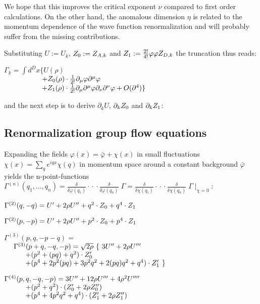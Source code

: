 \documentclass[a4paper,aps,prl,twocolumn,groupedaddress]{revtex4}
\begin{document}
\bigskip
\noindent
We hope that this improves the critical exponent $\nu$ compared to first order calculations.
On the other hand, the anomalous dimension $\eta$ is related to the momentum dependence of the
wave function renormalization and will probably suffer from the missing contributions.

\bigskip
\noindent
Substituting $U:=U_k$, $Z_0:=Z_{A,k}$ and $Z_1:=\frac{2!}{4!}\varphi \varphi Z_{D,k}$ the 
truncation thus reads:

\bigskip $ \Gamma_k = \int \limits d^Dx \{ U(\rho) $\\
$ ~~~~~~~~~~~~~~~~ + Z_0(\rho) \cdot \frac{1}{2!} \partial_\mu \varphi \partial^\mu \varphi $\\
$ ~~~~~~~~~~~~~~~~ + Z_1(\rho) \cdot \frac{1}{2!} \partial_\mu \partial^\mu \varphi \partial_\nu \partial^\nu \varphi + O(\partial^4) \} $

\bigskip
\noindent
and the next step is to derive $\partial_k U$, $\partial_k Z_0$ and $\partial_k Z_1$:





\newpage
\subsection*{Renormalization group flow equations}

\noindent
Expanding the fields $\varphi(x)=\bar{\varphi}+\chi(x)$ in small fluctuations
$\chi(x) = \sum_q e^{iqx} \chi(q)$ in momentum space around a constant background 
$\bar{\varphi}$ yields the n-point-functions
$ \Gamma^{(n)}(q_1,...,q_n) = \frac{\delta}{\delta \varphi(q_1)} \cdot\!\cdot\!\cdot \frac{\delta}{\delta \varphi(q_n)} \; \Gamma = \frac{\delta}{\delta \chi(q_1)} \cdot\!\cdot\!\cdot \frac{\delta}{\delta \chi(q_n)} \; \Gamma \mid_{\chi=0} $:


\bigskip $ \Gamma^{(2)}(q,-q) = U^\prime + 2 \rho U^{\prime\prime} + q^2 \cdot Z_0 + q^4 \cdot Z_1 $

\smallskip $ \Gamma^{(2)}(p,-p) = U^\prime + 2 \rho U^{\prime\prime} + p^2 \cdot Z_0 + p^4 \cdot Z_1 $

\smallskip $ \Gamma^{(3)}(p,q,-p-q) = $\\
$ ~~~~ \Gamma^{(3)}(p+q,-q,-p) = \sqrt{2\rho} ~ \{ ~ 3 U^{\prime\prime} + 2 \rho U^{\prime\prime\prime} $\\
$ ~~~~~~~~~ + (p^2+(pq)+q^2) \cdot {Z_0^\prime} $\\
$ ~~~~~~~~~ + (p^4+2p^2(pq)+3p^2q^2+2(pq)q^2+q^4) \cdot {Z_1^\prime} ~ \} $

\smallskip $ \Gamma^{(4)}(p,q,-q,-p) = 3 U^{\prime\prime} + 12 \rho U^{\prime\prime\prime} + 4 \rho^2 U^{\prime\prime\prime\prime} $\\
$ ~~~~~~~~~ +(p^2+q^2) \cdot ( {Z_0^\prime} + 2 \rho Z_0^{\prime\prime} ) $\\
$ ~~~~~~~~~ +(p^4+4p^2q^2+q^4) \cdot ( {Z_1^\prime} + 2 \rho Z_1^{\prime\prime} ) $
\end{document}
